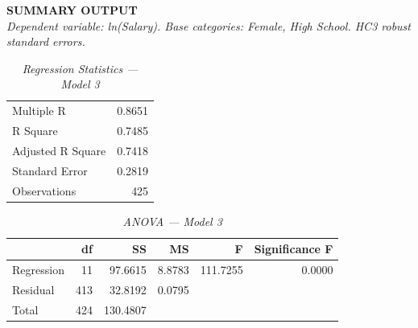 \documentclass[12pt, a4paper]{article}
\begin{document}
\noindent\textbf{SUMMARY OUTPUT}\\[0.4em]
\textit{Dependent variable: ln(Salary). Base categories: Female, High School. HC3 robust standard errors.}

\begin{table}[H]
\centering\scriptsize
\caption*{\textit{Regression Statistics — Model 3}}
\begin{tabular}{lr}
\toprule
Multiple R & 0.8651 \\
R Square & 0.7485 \\
Adjusted R Square & 0.7418 \\
Standard Error & 0.2819 \\
Observations & 425 \\
\bottomrule
\end{tabular}
\end{table}

\begin{table}[H]
\centering\scriptsize
\caption*{\textit{ANOVA — Model 3}}
\begin{tabular}{lrrrrr}
\toprule
 & \textbf{df} & \textbf{SS} & \textbf{MS} & \textbf{F} & \textbf{Significance F} \\
\midrule
Regression & 11 & 97.6615 &  8.8783 & 111.7255 & 0.0000 \\
Residual   & 413 & 32.8192 &  0.0795 & & \\
Total      & 424 & 130.4807 & & & \\
\bottomrule
\end{tabular}
\end{table}
\end{document}
